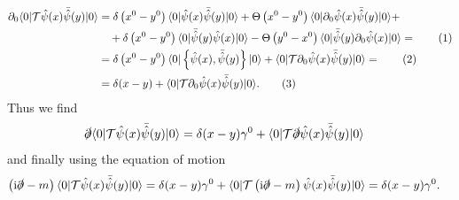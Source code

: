 \documentclass[english, parskip=full]{scrartcl}
\newcommand\numberthis{\addtocounter{equation}{1}\tag{\theequation}}
\renewcommand{\braket}{}
\newcommand{\kla}{}
\newcommand{\klammer}{}
\renewcommand{\i}{\text{i}}
\begin{document}
\begin{align*}
\partial_0 \langle 0 | \mathcal{T} \hat{\psi}(x) \bar{\hat{\psi}}(y) | 0 \rangle &= \delta\kla\left( x^0 - y^0 \right) \langle 0 | \hat{\psi}(x) \bar{\hat{\psi}}(y) | 0 \rangle + \Theta\kla\left( x^0 - y^0 \right) \langle 0 | \partial_0 \hat{\psi}(x) \bar{\hat{\psi}}(y) | 0 \rangle +\\
&\quad + \delta \kla\left( x^0 - y^0 \right) \langle 0 | \bar{\hat{\psi}}(y) \hat{\psi}(x) | 0 \rangle - \Theta\kla\left( y^0 - x^0 \right) \langle 0 | \bar{\hat{\psi}}(y) \partial_0 \hat{\psi}(x) | 0 \rangle = \numberthis\\
&= \delta\kla\left( x^0 - y^0 \right) \braket\langle 0 | \klammer\left\{ \hat{\psi}(x), \bar{\hat{\psi}}(y) \right\} | 0 \rangle + \langle 0 | \mathcal{T} \partial_0 \hat{\psi}(x) \bar{\hat{\psi}}(y) | 0 \rangle  = \numberthis \\
&= \delta (x - y) + \langle 0 | \mathcal{T} \partial_0\hat{\psi}(x) \bar{\hat{\psi}}(y) | 0 \rangle. \numberthis
\end{align*}
Thus we find
\begin{align}
\slashed{\partial} \langle 0 | \mathcal{T} \hat{\psi}(x) \bar{\hat{\psi}}(y) | 0 \rangle &= \delta (x-y)\gamma^0 + \langle 0 | \mathcal{T} \slashed{\partial} \hat{\psi}(x) \bar{\hat{\psi}}(y) | 0 \rangle
\end{align}
and finally using the equation of motion
\begin{align}
\kla\left( \i\slashed{\partial} - m \right) \langle 0 | \mathcal{T} \hat{\psi}(x) \bar{\hat{\psi}}(y) | 0 \rangle &= \delta (x-y)\gamma^0 + \langle 0 | \mathcal{T} \left( \i\slashed{\partial} - m \right) \hat{\psi}(x) \bar{\hat{\psi}}(y) | 0 \rangle = \delta (x-y)\gamma^0.
\end{align}
\end{document}
